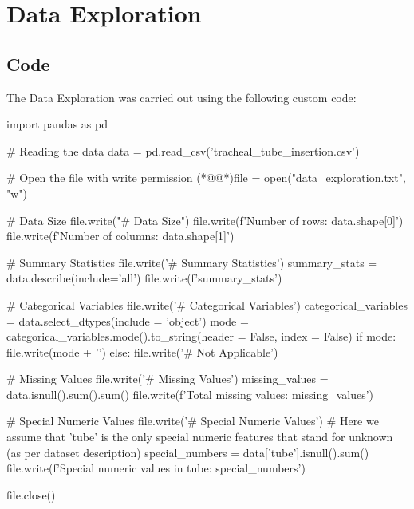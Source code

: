 \documentclass[11pt]{article}
\begin{document}

\section{Data Exploration}
\subsection{{Code}}
The Data Exploration was carried out using the following custom code:

\begin{python}

import pandas as pd

# Reading the data
data = pd.read_csv('tracheal_tube_insertion.csv')

# Open the file with write permission
(*@@*)file = open("data_exploration.txt", "w")

# Data Size
file.write("# Data Size\n")
file.write(f'Number of rows: {data.shape[0]}\n')
file.write(f'Number of columns: {data.shape[1]}\n')

# Summary Statistics
file.write('\n# Summary Statistics\n')
summary_stats = data.describe(include='all')
file.write(f'{summary_stats}\n')

# Categorical Variables 
file.write('\n# Categorical Variables\n')
categorical_variables = data.select_dtypes(include = 'object')
mode = categorical_variables.mode().to_string(header = False, index = False)
if mode: 
    file.write(mode + '\n')
else:
    file.write('# Not Applicable\n')

# Missing Values
file.write('\n# Missing Values\n')
missing_values = data.isnull().sum().sum()
file.write(f'Total missing values: {missing_values}\n')

# Special Numeric Values
file.write('\n# Special Numeric Values\n')
# Here we assume that 'tube' is the only special numeric features that stand for unknown (as per dataset description)
special_numbers = data['tube'].isnull().sum()
file.write(f'Special numeric values in tube: {special_numbers}\n')

file.close()

\end{python}
\end{document}
